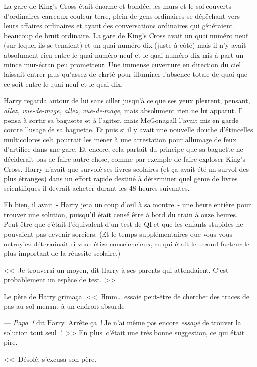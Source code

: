 La gare de King's Cross était énorme et bondée, les murs et le sol couverts d'ordinaires carreaux couleur terre, plein de gens ordinaires se dépêchant vers leurs affaires ordinaires et ayant des conversations ordinaires qui généraient beaucoup de bruit ordinaire. La gare de King's Cross avait un quai numéro neuf (sur lequel ils se tenaient) et un quai numéro dix (juste à côté) mais il n'y avait absolument rien entre le quai numéro neuf et le quai numéro dix mis à part un mince mur-écran peu prometteur. Une immense ouverture en direction du ciel laissait entrer plus qu'assez de clarté pour illuminer l'absence totale de quoi que ce soit entre le quai neuf et le quai dix.

Harry regarda autour de lui sans ciller jusqu'à ce que ses yeux pleurent, pensant, \emph{allez, vue-de-mage, allez, vue-de-mage}, mais absolument rien ne lui apparut. Il pensa à sortir sa baguette et à l'agiter, mais McGonagall l'avait mis en garde contre l'usage de sa baguette. Et puis si il y avait une nouvelle douche d'étincelles multicolores cela pourrait les mener à une arrestation pour allumage de feux d'artifice dans une gare. Et encore, cela partait du principe que sa baguette ne déciderait pas de faire autre chose, comme par exemple de faire exploser King's Cross. Harry n'avait que survolé ses livres scolaires (et ça avait été un survol des plus étranges) dans un effort rapide destiné à déterminer quel genre de livres scientifiques il devrait acheter durant les 48 heures suivantes.

Eh bien, il avait~- Harry jeta un coup d'œil à sa montre~- une heure entière pour trouver une solution, puisqu'il était censé être à bord du train à onze heures. Peut-être que c'était l'équivalent d'un test de QI et que les enfants stupides ne pouvaient pas devenir sorciers. (Et le temps supplémentaires que vous vous octroyiez déterminait si vous étiez consciencieux, ce qui était le second facteur le plus important de la réussite scolaire.)

<<~Je trouverai un moyen, dit Harry à ses parents qui attendaient. C'est probablement un espèce de test.~>>

Le père de Harry grimaça. <<~Hmm… essaie peut-être de chercher des traces de pas au sol menant à un endroit absurde~-

--- \emph{Papa~!} dit Harry. Arrête ça~! Je n'ai même pas encore \emph{essayé} de trouver la solution tout seul~!~>> En plus, c'était une très bonne suggestion, ce qui était pire.

<<~Désolé, s'excusa son père.

